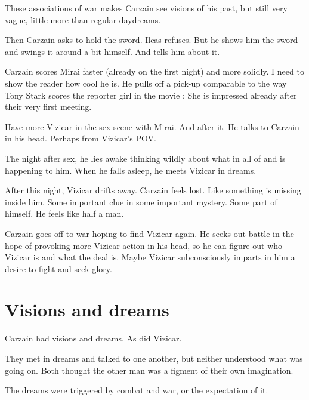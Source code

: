 \begin{garbage}
These associations of war makes Carzain see visions of his past, but still very vague, little more than regular daydreams. 

Then Carzain asks to hold the sword. 
Ilcas refuses. 
But he shows him the sword and swings it around a bit himself. 
And tells him about it. 

Carzain scores Mirai faster (already on the first night) and more solidly. 
I need to show the reader how cool he is. 
He pulls off a pick-up comparable to the way Tony Stark scores the reporter girl in the movie \cite{Movie:IronMan}: 
She is impressed already after their very first meeting. 

Have more Vizicar in the sex scene with Mirai. 
And after it. 
He talks to Carzain in his head. 
Perhaps from Vizicar's POV. 

The night after sex, he lies awake thinking wildly about what in all of \Iquin{} and \Itzach{} is happening to him. 
When he falls asleep, he meets Vizicar in dreams. 

After this night, Vizicar drifts away. 
Carzain feels lost. 
Like something is missing inside him. 
Some important clue in some important mystery. 
Some part of himself. 
He feels like half a man. 

Carzain goes off to war hoping to find Vizicar again.  
He seeks out battle in the hope of provoking more Vizicar action in his head, so he can figure out who Vizicar is and what the deal is. 
Maybe Vizicar subconsciously imparts in him a desire to fight and seek glory. 
















\section{Visions and dreams}
Carzain had visions and dreams. 
As did Vizicar. 

They met in dreams and talked to one another, but neither understood what was going on. 
Both thought the other man was a figment of their own imagination. 

The dreams were triggered by combat and war, or the expectation of it. 










\end{garbage}
